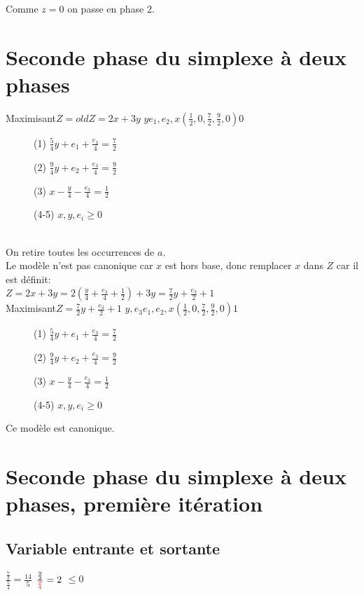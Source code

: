 Comme $z = 0$ on passe en phase 2.
\section{Seconde phase du simplexe à deux phases}
        {Maximisant}{$Z = oldZ = 2x + 3y$}
        {$y$}{$e_1,e_2,x$}{$(\frac{1}{2},0,\frac{7}{2}, \frac{9}{2}, 0)$}{$0$}
        {\begin{description}
\item[] (1) $\frac{5}{4}y + e_1 + \frac{e_3}{4} = \frac{7}{2}$
\item[] (2) $\frac{9}{4}y + e_2 + \frac{e_3}{4} = \frac{9}{2}$
\item[] (3) $x - \frac{y}{4} - \frac{e_3}{4} = \frac{1}{2}$
\item[] (4-5) $x,y,e_i \geqslant 0$
\end{description}
}\ \\
On retire toutes les occurrences de $a$.\\
Le modèle n'est pas canonique car $x$ est hors base, donc remplacer $x$ dans $Z$ car il est définit:\\
$Z = 2x + 3y = 2(\frac{y}{4} + \frac{e_3}{4} + \frac{1}{2}) + 3y = \frac{7}{2}y + \frac{e_3}{2} + 1$\\

        {Maximisant}{$Z = \frac{7}{2}y + \frac{e_3}{2} + 1$}
        {$y,e_3$}{$e_1,e_2,x$}{$(\frac{1}{2},0,\frac{7}{2}, \frac{9}{2}, 0)$}{$1$}
        {\begin{description}
\item[] (1) $\frac{5}{4}y + e_1 + \frac{e_3}{4} = \frac{7}{2}$
\item[] (2) $\frac{9}{4}y + e_2 + \frac{e_3}{4} = \frac{9}{2}$
\item[] (3) $x - \frac{y}{4} - \frac{e_3}{4} = \frac{1}{2}$
\item[] (4-5) $x,y,e_i \geqslant 0$
\end{description}
}
Ce modèle est canonique.

\section{Seconde phase du simplexe à deux phases, première itération}
\subsection{Variable entrante et sortante}
  {$\frac{\frac{7}{2}}{\frac{5}{4}} = \frac{14}{5}$}
  {$\frac{\frac{9}{2}}{\textcolor{red}{\frac{9}{4}}} = 2$}
  {$ \leqslant 0 $}

